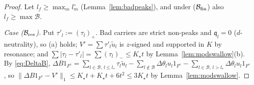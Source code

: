 \begin{proof}
Let $l_f\ge\max_ml^\circ_m$ (Lemma~\ref{lem:badpeaks}), and under
($\mathcal B_{\rm fin}$) also $l_f\ge\max\mathcal B$.

\emph{Case ($\mathcal B_{\rm res}$).}  Put $\tau'_l:=(\tau_l)_+$.  Bad
carriers are strict non-peaks and $\mathfrak q_l=0$ ($d$-neutrality), so
(a) holds; $V'=\sum\tau'_l\tilde u_l$ is $z$-signed and supported in $K$
by resonance; and $\sum|\tau_l-\tau'_l|=\sum(\tau_l)_-\le K_\star t$ by
Lemma~\ref{lem:modswallow}(b).  By \eqref{eq:DeltaB}, $\Delta B1_{F^c}=
\sum_{l\in\mathcal B,\,l\le l_*}\tau_l\tilde u_l-\sum_{l\notin\mathcal B}
\Delta\theta_lu_l1_{F^c}-\sum_{l\in\mathcal B,\,l>l_*}\Delta\theta_lu_l
1_{F^c}$, so $\|\Delta B1_{F^c}-V'\|_1\le K_\star t+K_\star t+6t^2\le3K_\star t$
by Lemma~\ref{lem:modswallow}.


\end{proof}
